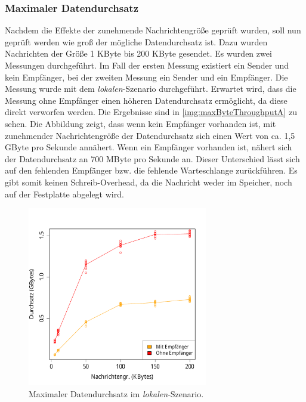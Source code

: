 \subsubsection{Maximaler Datendurchsatz}
\label{sec:maxthroughput}
Nachdem die Effekte der zunehmende Nachrichtengröße geprüft wurden, soll nun geprüft werden wie groß der mögliche Datendurchsatz ist. Dazu wurden Nachrichten der Größe 1 KByte bis 200 KByte gesendet. Es wurden zwei Messungen durchgeführt. Im Fall der ersten Messung existiert ein Sender und kein Empfänger, bei der zweiten Messung ein Sender und ein Empfänger. Die Messung wurde mit dem \textit{lokalen}-Szenario durchgeführt. Erwartet wird, dass die Messung ohne Empfänger einen höheren Datendurchsatz ermöglicht, da diese direkt verworfen werden. 
Die Ergebnisse sind in \autoref{img:maxByteThroughputA} zu sehen. Die Abbildung zeigt, dass wenn kein Empfänger vorhanden ist, mit zunehmender Nachrichtengröße der Datendurchsatz sich einen Wert von ca. 1,5 GByte pro Sekunde annähert. Wenn ein Empfänger vorhanden ist, nähert sich der Datendurchsatz an 700 MByte pro Sekunde an. Dieser Unterschied lässt sich auf den fehlenden Empfänger bzw. die fehlende Warteschlange zurückführen. Es gibt somit keinen Schreib-Overhead, da die Nachricht weder im Speicher, noch auf der Festplatte abgelegt wird.
\begin{figure}
\center
  \includegraphics[width=0.7\textwidth]{images/measurement/rate-limit-unlimited-consumer-vs-no-consumer.pdf}
  \caption{Maximaler Datendurchsatz im \textit{lokalen}-Szenario.}
  \label{img:maxByteThroughputA}
\end{figure}



